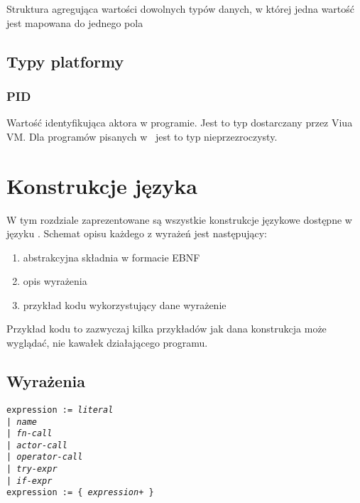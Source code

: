 Struktura agregująca wartości dowolnych typów danych, w której jedna
wartość jest mapowana do jednego pola

\subsection{Typy platformy}

\subsubsection{PID}

Wartość identyfikująca aktora w programie.
Jest to typ dostarczany przez Viua VM. Dla programów pisanych w \ViuAct\ jest to
typ nieprzezroczysty.

\section{Konstrukcje języka}

W tym rozdziale zaprezentowane są wszystkie konstrukcje językowe dostępne w języku \ViuAct.
Schemat opisu każdego z wyrażeń jest następujący:

\begin{enumerate}
    \item abstrakcyjna składnia w formacie EBNF
    \item opis wyrażenia
    \item przykład kodu wykorzystujący dane wyrażenie
\end{enumerate}

Przykład kodu to zazwyczaj kilka przykładów jak dana konstrukcja może wyglądać, nie kawałek działającego
programu.

\subsection{Wyrażenia}
\label{language_expressions}

\texttt{expression := \emph{literal} \\
\phantom{expression :}| \emph{name} \\
\phantom{expression :}| \emph{fn-call} \\
\phantom{expression :}| \emph{actor-call} \\
\phantom{expression :}| \emph{operator-call} \\
\phantom{expression :}| \emph{try-expr} \\
\phantom{expression :}| \emph{if-expr}}
\\
\texttt{expression := \{ \emph{expression}+ \}}
\vspace{1em}

